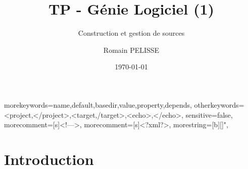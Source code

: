 \documentclass[handout]{beamer}
\title{TP - Génie Logiciel (1)}
\subtitle{Construction et gestion de sources}
\author{Romain PELISSE}
\institute{ESME Sudria}
\date{\today}
\begin{document}
	{
		morekeywords={name,default,basedir,value,property,depends},
		otherkeywords={<project,</project>,<target,/target>,<echo>,</echo>},
		sensitive=false,
		morecomment=[s]{<!--}{-->},
		morecomment=[s]{<?xml}{?>},
		morestring=[b][\color{red}]",
	}


\frame{\titlepage}

\section[Outline]{}
\frame{\tableofcontents}

\section{Introduction}
\end{document}
